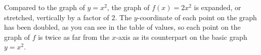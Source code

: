 \documentclass[10pt,]{book}
\theoremstyle{plain}
\theoremstyle{definition}
\theoremstyle{definition}
\numberwithin{equation}{section}
\newcommand{\hrulethin}  {\noalign{\hrule height 0.04em}}
\newcommand{\hrulethick} {\noalign{\hrule height 0.11em}}
\newcounter{figstack}
\newcounter{figindex}
\newlength\fight
\newcommand\pushValignCaptionBottom[5][b]{%
\stepcounter{figstack}%
\expandafter\def\csname %
figalign\romannumeral\value{figstack}\endcsname{#1}%
\expandafter\def\csname %
figtype\romannumeral\value{figstack}\endcsname{#2}%
\expandafter\def\csname %
figwd\romannumeral\value{figstack}\endcsname{#3}%
\expandafter\def\csname %
figcontent\romannumeral\value{figstack}\endcsname{#4}%
\expandafter\def\csname %
figcap\romannumeral\value{figstack}\endcsname{#5}%
\setbox0=\hbox{%
\begin{#2}{#3}#4\end{#2}}%
\ifdim\dimexpr\ht0+\dp0\relax>\fight\global\setlength{\fight}{%
\dimexpr\ht0+\dp0\relax}\fi%
}
\newcommand\popValignCaptionBottom{%
\setcounter{figindex}{0}%
\hfill%
\whiledo{\value{figindex}<\value{figstack}}{%
\stepcounter{figindex}%
\def\tmp{\csname figwd\romannumeral\value{figindex}\endcsname}%
\begin{\csname figtype\romannumeral\value{figindex}\endcsname}[t]{\tmp}%
\centering%
\stackinset{c}{}%
{\csname figalign\romannumeral\value{figindex}\endcsname}{}%
{\csname figcontent\romannumeral\value{figindex}\endcsname}%
{\rule{0pt}{\fight}}\par%
\csname figcap\romannumeral\value{figindex}\endcsname%
\end{\csname figtype\romannumeral\value{figindex}\endcsname}%
\hfill%
}%
\setcounter{figstack}{0}%
\setlength{\fight}{0pt}%
\hfill%
}
\begin{document}
    Compared to the graph of \(y = x^2\), the graph of \(f (x) = 2x^2\) is expanded, or stretched, vertically by a factor of \(2\). The \(y\)-coordinate of each point on the graph has been doubled, as you can see in the table of values, so each point on the graph of \(f\) is twice as far from the \(x\)-axis as its counterpart on the basic graph \(y = x^2\).
%
\leavevmode%
\par
\end{document}
